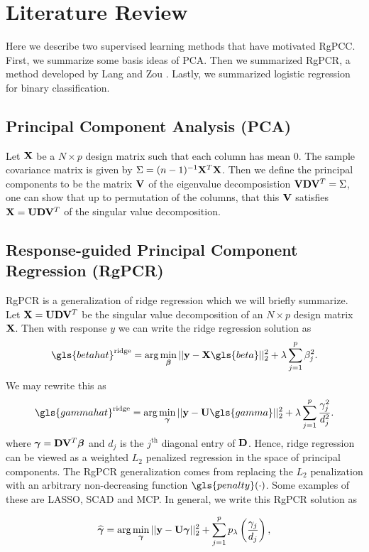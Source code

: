 \documentclass[main.tex]{subfiles}
\begin{document}
\section{Literature Review}
Here we describe two supervised learning methods that have motivated RgPCC. First, we summarize some basis ideas of PCA. Then we summarized RgPCR, a method developed by Lang and Zou \cite{langzou}.  Lastly, we summarized logistic regression for binary classification.

\subsection{Principal Component Analysis (PCA)}
Let $\mathbf{X}$ be a $N \times p$ design matrix such that each column has mean 0. The sample covariance matrix is given by $\Sigma = (n-1)^{-1} \mathbf{X}^T \mathbf{X}$. Then we define the principal components to be the matrix $\mathbf{V}$ of the eigenvalue decomposistion $\mathbf{V} \mathbf{D} \mathbf{V}^T = \Sigma$, one can show that up to permutation of the columns, that this $\mathbf{V}$ satisfies $\mathbf{X} = \mathbf{U} \mathbf{D} \mathbf{V}^T$ of the singular value decomposition.

\subsection{Response-guided Principal Component Regression (RgPCR)}
RgPCR is a generalization of ridge regression which we will briefly summarize. Let $\mathbf{X} = \mathbf{U} \mathbf{D} \mathbf{V}^T$ be the singular value decomposition of an $N \times p$ design matrix $\mathbf{X}$. Then with response $y$ we can write the ridge regression solution as
\begin{align}
    \gls{betahat}^{\ridge} = \argmin_{\bbeta} ||\y - \X \gls{beta}||_2^2 + \lambda \sum_{j = 1}^p \beta_j^2.
\end{align}
We may rewrite this as
\begin{align}
    \gls{gammahat}^{\ridge} = \argmin_{\bgamma} ||\y - \U \gls{gamma}||^2_2 + \lambda \sum_{j = 1}^p \frac{\gamma_j^2}{d_j^2}. \label{RgPCR_ridge}
\end{align}
where $\boldsymbol \gamma = \mathbf{D} \mathbf{V}^T \boldsymbol \beta$ and $d_j$ is the $j^{\text{th}}$ diagonal entry of $\mathbf{D}$. Hence, ridge regression can be viewed as a weighted $L_2$ penalized regression in the space of principal components. The RgPCR generalization comes from replacing the $L_2$ penalization with an arbitrary non-decreasing function $\gls{penalty}(\cdot)$. Some examples of these are LASSO, SCAD and MCP. In general, we write this RgPCR solution as

\begin{align}
    \widehat{\boldsymbol \gamma} = \text{arg} \min_{\boldsymbol \gamma} ||\mathbf{y} - \mathbf{U} \boldsymbol \gamma||^2_2 + \sum_{j = 1}^p p_\lambda \left ( \frac{\gamma_j}{d_j} \right ), \label{RgPCR_def}
\end{align}
\end{document}
